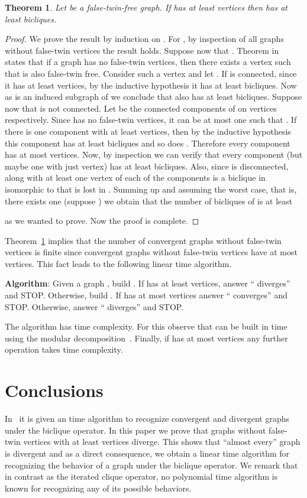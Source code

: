 \documentclass[12pt]{article}
\newtheorem{theorem}{Theorem}[section]
\begin{document}
\begin{theorem}\label{13}
Let  be a false-twin-free graph. If  has at least  vertices then  has at least  bicliques.
\end{theorem}
\begin{proof}
We prove the result by induction on . For , by inspection of all graphs without false-twin vertices the result holds.
Suppose now that . 
Theorem  in~\cite{Sumner} states that if a graph  has no false-twin vertices, then there exists a vertex  such that  is also 
false-twin free. Consider such a vertex  and let . If  is connected, since it has at least  vertices, by the inductive hypothesis it has at least  bicliques.
Now as  is an induced subgraph of  we conclude that  also has at least  bicliques. Suppose now that  is not connected.
Let  be the connected components of  on  vertices respectively. Since  has no 
false-twin vertices, it can be at most one  such that . If there is one component with at least  vertices, then by the inductive 
hypothesis this component has at least  bicliques and so does . Therefore every component has at most  vertices. Now, by inspection we can 
verify that every component  (but maybe one with just  vertex) has at least  bicliques. Also, since  is 
disconnected,  along with at least one vertex of each of the  components is a biclique in  isomorphic to  that is lost in . 
Summing up and assuming the worst case, that is, there exists one  (suppose ) we obtain that the number of bicliques of  is at least 

as we wanted to prove. Now the proof is complete.
\end{proof}

Theorem~\ref{13} implies that the number of convergent graphs without false-twin vertices is finite since convergent graphs without false-twin 
vertices have at most  vertices. This fact leads to the following linear time algorithm. 

\textbf{Algorithm}: Given a graph , build . If  has at least  vertices, answer `` diverges'' and STOP.
Otherwise, build . If  has at most  vertices answer `` converges'' and STOP. Otherwise, answer `` diverges'' and STOP.

The algorithm has  time complexity. For this observe that  can be built in  time using the modular decomposition~\cite{modulardecomp}. 
Finally, if  has at most  vertices any further operation takes  time complexity.

\section{Conclusions}
In~\cite{marinayo} it is given an  time algorithm to recognize convergent and divergent graphs under the biclique operator. 
In this paper we prove that graphs without false-twin vertices with at least  vertices diverge. This shows that ``almost every'' graph is 
divergent and as a direct consequence, we obtain a linear time algorithm for recognizing the behavior of a graph under the biclique operator. 
We remark that in contrast as the iterated clique operator, no polynomial time algorithm is known for recognizing any of its possible behaviors. 


\end{document}
